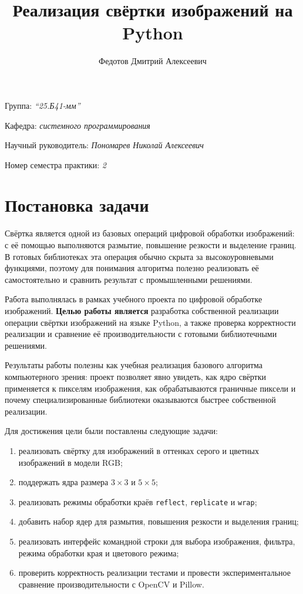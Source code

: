 \documentclass[a4paper]{article}
\title{Реализация свёртки изображений на Python}
\author{Федотов Дмитрий Алексеевич}
\date{}
\begin{document}
\maketitle

\begin{flushright}
    Группа: \emph{\enquote{25.Б41-мм}}

    Кафедра: \emph{системного программирования}

    Научный руководитель: \emph{Пономарев Николай Алексеевич}

    Номер семестра практики: \emph{2}
\end{flushright}

\section{Постановка задачи}

Свёртка является одной из базовых операций цифровой обработки изображений: с её помощью выполняются размытие, повышение резкости и выделение границ. В готовых библиотеках эта операция обычно скрыта за высокоуровневыми функциями, поэтому для понимания алгоритма полезно реализовать её самостоятельно и сравнить результат с промышленными решениями.

Работа выполнялась в рамках учебного проекта по цифровой обработке изображений. \textbf{Целью работы является} разработка собственной реализации операции свёртки изображений на языке Python, а также проверка корректности реализации и сравнение её производительности с готовыми библиотечными решениями.

Результаты работы полезны как учебная реализация базового алгоритма компьютерного зрения: проект позволяет явно увидеть, как ядро свёртки применяется к пикселям изображения, как обрабатываются граничные пиксели и почему специализированные библиотеки оказываются быстрее собственной реализации.

Для достижения цели были поставлены следующие задачи:
\begin{enumerate}
    \item реализовать свёртку для изображений в оттенках серого и цветных изображений в модели RGB;
    \item поддержать ядра размера \(3 \times 3\) и \(5 \times 5\);
    \item реализовать режимы обработки краёв \texttt{reflect}, \texttt{replicate} и \texttt{wrap};
    \item добавить набор ядер для размытия, повышения резкости и выделения границ;
    \item реализовать интерфейс командной строки для выбора изображения, фильтра, режима обработки края и цветового режима;
    \item проверить корректность реализации тестами и провести экспериментальное сравнение производительности с OpenCV и Pillow.
\end{enumerate}
\end{document}
